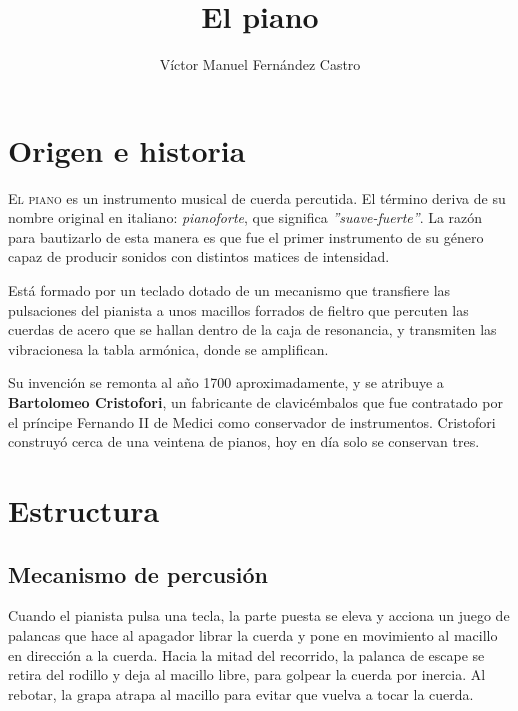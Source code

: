 \documentclass[10pt,a4paper]{article}
\title{El piano}
\author{Víctor Manuel Fernández Castro}
\begin{document}
	\maketitle
	\thispagestyle{empty}
	
	
	\newpage
	\section{Origen e historia}
	
	\lettrine{E}{l piano} es un instrumento musical de cuerda percutida. El 
	término deriva de su nombre original en italiano: \textit{pianoforte}, que  
	significa \textit{''suave-fuerte''}. La razón para bautizarlo de esta 
	manera es que fue el primer instrumento de su género capaz de producir 
	sonidos con distintos matices de intensidad.
	
	Está formado por un teclado dotado de un mecanismo que transfiere las 
	pulsaciones del pianista a unos macillos forrados de fieltro que percuten 
	las cuerdas de acero que se hallan dentro de la caja de resonancia, y 
	transmiten las vibracionesa la tabla armónica, donde se amplifican.
	
	Su invención se remonta al año 1700 aproximadamente, y se atribuye a \textbf
	{Bartolomeo Cristofori}, un fabricante de clavicémbalos que fue  contratado 
	por el príncipe Fernando II de Medici como conservador de  instrumentos. 
	Cristofori construyó cerca de una veintena de pianos, hoy en día solo se 
	conservan tres.
	
	
	\clearpage
	\section{Estructura}
	
	\subsection{Mecanismo de percusión}
	
	Cuando el pianista pulsa una tecla, la parte puesta se eleva y acciona un 
	juego de palancas que hace al apagador librar la cuerda y pone en 
	movimiento al macillo en dirección a la cuerda. Hacia la mitad del 
	recorrido, la palanca de escape se retira del rodillo y deja al macillo 
	libre, para golpear la cuerda por inercia. Al rebotar, la grapa atrapa al 
	macillo para evitar que vuelva a tocar la cuerda.
	
\end{document}
